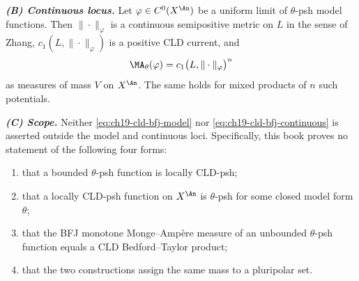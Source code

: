 \begin{theorem}
\emph{\textbf{(B) Continuous locus.}}  Let $\varphi\in C^0(X^{\An})$ be a
uniform limit of $\theta$-psh model functions.  Then
$\|\cdot\|_\varphi$ is a continuous semipositive metric on $L$ in the
sense of Zhang, $c_1(L,\|\cdot\|_\varphi)$ is a positive CLD current, and
\begin{equation}
\label{eq:ch19-cld-bfj-continuous}
 \MA_\theta(\varphi)=c_1\bigl(L,\|\cdot\|_\varphi\bigr)^n
\end{equation}
as measures of mass $V$ on $X^{\An}$.  The same holds for mixed products
of $n$ such potentials.

\emph{\textbf{(C) Scope.}}  Neither \eqref{eq:ch19-cld-bfj-model} nor
\eqref{eq:ch19-cld-bfj-continuous} is asserted outside the model and
continuous loci.  Specifically, this book proves no statement of the
following four forms:
\begin{enumerate}[resume]
\item\label{itm:ch19-cb:scope1} that a bounded $\theta$-psh function is
 locally CLD-psh;
\item\label{itm:ch19-cb:scope2} that a locally CLD-psh function on
 $X^{\An}$ is $\theta$-psh for some closed model form $\theta$;
\item\label{itm:ch19-cb:scope3} that the BFJ monotone Monge--Amp\`ere
 measure of an unbounded $\theta$-psh function equals a CLD
 Bedford--Taylor product;
\item\label{itm:ch19-cb:scope4} that the two constructions assign the same
 mass to a pluripolar set.
\end{enumerate}
\end{theorem}

